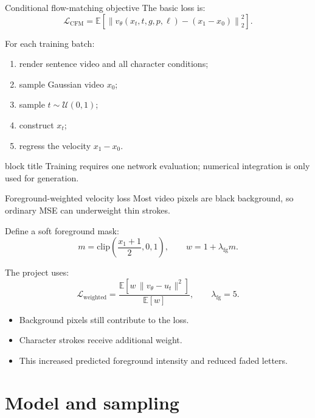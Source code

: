 \documentclass[aspectratio=169,xcolor=svgnames]{beamer}
\newcommand{\keypoint}[1]{%
\begin{center}
\begin{beamercolorbox}[rounded=true,shadow=true,wd=0.88\textwidth,sep=0.6em,center]{block title}
#1
\end{beamercolorbox}
\end{center}
}
\begin{document}
\begin{frame}{Conditional flow-matching objective}
The basic loss is:
\[
\mathcal{L}_{\mathrm{CFM}}
=
\mathbb{E}
\left[
\left\|
v_\theta(x_t,t,g,p,\ell)-(x_1-x_0)
\right\|_2^2
\right].
\]

For each training batch:
\begin{enumerate}
    \item render sentence video and all character conditions;
    \item sample Gaussian video $x_0$;
    \item sample $t\sim\mathcal{U}(0,1)$;
    \item construct $x_t$;
    \item regress the velocity $x_1-x_0$.
\end{enumerate}

\keypoint{Training requires one network evaluation; numerical integration is only used for generation.}
\end{frame}

\begin{frame}{Foreground-weighted velocity loss}
Most video pixels are black background, so ordinary MSE can underweight thin strokes.

Define a soft foreground mask:
\[
m=\mathrm{clip}\left(\frac{x_1+1}{2},0,1\right),
\qquad
w=1+\lambda_{\mathrm{fg}}m.
\]

The project uses:
\[
\mathcal{L}_{\mathrm{weighted}}
=
\frac{\mathbb{E}[w\,\|v_\theta-u_t\|^2]}{\mathbb{E}[w]},
\qquad \lambda_{\mathrm{fg}}=5.
\]

\begin{itemize}
    \item Background pixels still contribute to the loss.
    \item Character strokes receive additional weight.
    \item This increased predicted foreground intensity and reduced faded letters.
\end{itemize}
\end{frame}

\section{Model and sampling}
\end{document}
